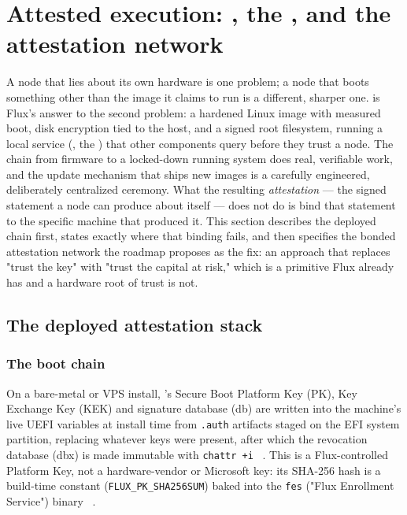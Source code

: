 \section{Attested execution: \ArcaneOS, the \SAS, and the attestation network}
\label{sec:attested-execution}\label{sec:attestation}

A node that lies about its own hardware is one problem; a node that boots something other than
the image it claims to run is a different, sharper one. \ArcaneOS is Flux's answer to the second
problem: a hardened Linux image with measured boot, disk encryption tied to the host, and a
signed root filesystem, running a local service (\fluxsas, the \SAS) that other components query
before they trust a node. The chain from firmware to a locked-down running system does real,
verifiable work, and the update mechanism that ships new images is a carefully engineered,
deliberately centralized ceremony. What the resulting \emph{attestation} — the signed statement a
node can produce about itself — does not do is bind that statement to the specific machine that
produced it. This section describes the deployed chain first, states exactly where that binding
fails, and then specifies the bonded attestation network the roadmap proposes as the fix: an
approach that replaces "trust the key" with "trust the capital at risk," which is a primitive
Flux already has and a hardware root of trust is not.

\subsection{The deployed attestation stack}

\subsubsection{The boot chain}
\label{sec:boot-chain}

On a bare-metal or VPS install, \ArcaneOS's Secure Boot Platform Key (PK), Key Exchange Key (KEK)
and signature database (db) are written into the machine's live UEFI variables at install time
from \texttt{.auth} artifacts staged on the EFI system partition, replacing whatever keys were
present, after which the revocation database (dbx) is made immutable with \texttt{chattr~+i}
\shipped~. This is a
Flux-controlled Platform Key, not a hardware-vendor or Microsoft key: its SHA-256 hash is a
build-time constant (\texttt{FLUX\_PK\_SHA256SUM}) baked into the \texttt{fes} ("Flux Enrollment
Service") binary \shipped~.


